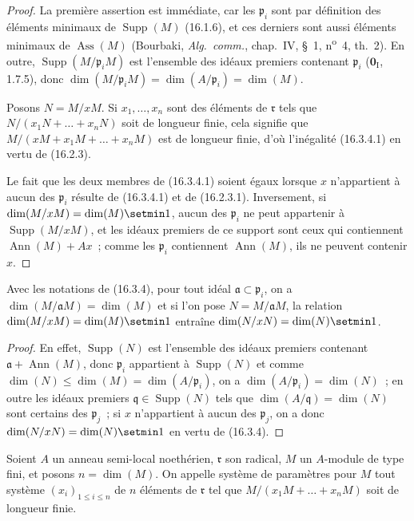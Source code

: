 \begin{proof}
La première assertion est immédiate, car les $\mathfrak{p}_i$ sont par
définition des éléments minimaux de $\operatorname{Supp}(M)$ (16.1.6), et ces
derniers sont aussi éléments minimaux de $\operatorname{Ass}(M)$ (Bourbaki,
\emph{Alg.~comm.}, chap.~IV, \S~1, n\textsuperscript{o}~4, th.~2). En outre,
$\operatorname{Supp}(M/\mathfrak{p}_iM)$ est l'ensemble des idéaux premiers
contenant $\mathfrak{p}_i$ ($\mathbf{0}_{\mathrm I}$, 1.7.5), donc
$\dim(M/\mathfrak{p}_iM)=\dim(A/\mathfrak{p}_i)=\dim(M)$.

Posons $N=M/xM$. Si $x_1,\ldots,x_n$ sont des éléments de $\mathfrak{r}$ tels
que $N/(x_1N+\ldots+x_nN)$ soit de longueur finie, cela signifie que
$M/(xM+x_1M+\ldots+x_nM)$ est de longueur finie, d'où l'inégalité (16.3.4.1)
en vertu de (16.2.3).

Le fait que les deux membres de (16.3.4.1) soient égaux lorsque $x$
n'appartient à aucun des $\mathfrak{p}_i$ résulte de (16.3.4.1) et de
(16.2.3.1). Inversement, si
$\dim(M/xM)=\dim(M)\setmin 1$, aucun des $\mathfrak{p}_i$ ne peut appartenir à
$\operatorname{Supp}(M/xM)$, et les idéaux premiers de ce support sont ceux
qui contiennent $\operatorname{Ann}(M)+Ax$~; comme les $\mathfrak{p}_i$
contiennent $\operatorname{Ann}(M)$, ils ne peuvent contenir $x$.
\end{proof}

\begin{corollary}[16.3.5]
\label{0.16.3.5-fr}
Avec les notations de \textup{(16.3.4)}, pour tout idéal
$\mathfrak{a}\subset\mathfrak{p}_i$, on a
$\dim(M/\mathfrak{a}M)=\dim(M)$ et si l'on pose
$N=M/\mathfrak{a}M$, la relation $\dim(M/xM)=\dim(M)\setmin 1$ entraîne
$\dim(N/xN)=\dim(N)\setmin 1$.
\end{corollary}

\begin{proof}
En effet, $\operatorname{Supp}(N)$ est l'ensemble des idéaux premiers
contenant $\mathfrak{a}+\operatorname{Ann}(M)$, donc $\mathfrak{p}_i$
appartient à $\operatorname{Supp}(N)$ et comme
$\dim(N)\leq\dim(M)=\dim(A/\mathfrak{p}_i)$, on a
$\dim(A/\mathfrak{p}_i)=\dim(N)$~; en outre les idéaux premiers
$\mathfrak{q}\in\operatorname{Supp}(N)$ tels que
$\dim(A/\mathfrak{q})=\dim(N)$ sont certains des $\mathfrak{p}_j$~; si $x$
n'appartient à aucun des $\mathfrak{p}_j$, on a donc
$\dim(N/xN)=\dim(N)\setmin 1$ en vertu de (16.3.4).
\end{proof}

\begin{definition}[16.3.6]
\label{0.16.3.6-fr}
Soient $A$ un anneau semi-local noethérien, $\mathfrak{r}$ son radical, $M$ un
$A$-module de type fini, et posons $n=\dim(M)$. On appelle système de
paramètres pour $M$ tout système $(x_i)_{1\leq i\leq n}$ de $n$ éléments de
$\mathfrak{r}$ tel que $M/(x_1M+\ldots+x_nM)$ soit de longueur finie.
\end{definition}

